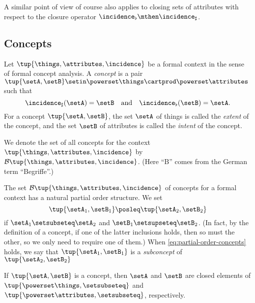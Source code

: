 A similar point of view of course also applies to closing sets of attributes with respect to the closure operator $\incidence_\flat \mthen \incidence_\sharp$.

\subsection{Concepts}

\begin{definition}\label{def:cfa-concept}
    Let $\tup{\things, \attributes, \incidence}$ be a formal context in the sense of formal concept analysis.
    A \emph{concept} is a pair $\tup{\setA, \setB} \setin \powerset\things \cartprod \powerset\attributes$ such that
    \begin{equation}\label{eq:def-concept-equations}
        \incidence_\sharp(\setA) = \setB \quad \text{and} \quad \incidence_\flat(\setB) = \setA.
    \end{equation}
    For a concept $\tup{\setA, \setB}$, the set $\setA$ of things is called the \emph{extent} of the concept, and the set $\setB$ of attributes is called the \emph{intent} of the concept.

    We denote the set of all concepts for the context $\tup{\things, \attributes, \incidence}$ by $\mathcal{B}\tup{\things, \attributes, \incidence}$.
    (Here ``B'' comes from the German term ``Begriffe''.)
\end{definition}

The set $\mathcal{B}\tup{\things, \attributes, \incidence}$ of concepts for a formal context has a natural partial order structure.
We set
\begin{equation}\label{eq:partial-order-concepts}
    \tup{\setA_1, \setB_1} \posleq \tup{\setA_2, \setB_2}
\end{equation}
if $\setA_1 \setsubseteq \setA_2$ and $\setB_1 \setsupseteq \setB_2$.
(In fact, by the definition of a concept, if one of the latter inclusions holds, then so must the other, so we only need to require one of them.) When \cref{eq:partial-order-concepts} holds, we say that $\tup{\setA_1, \setB_1}$ is a \emph{subconcept} of $\tup{\setA_2, \setB_2}$

\begin{lemma}\label{lem:extents-and-intents-are-closed}
    If $\tup{\setA, \setB}$ is a concept, then $\setA$ and $\setB$ are closed elements of $\tup{\powerset \things, \setsubseteq}$ and $\tup{\powerset \attributes, \setsubseteq}$, respectively.
\end{lemma}

